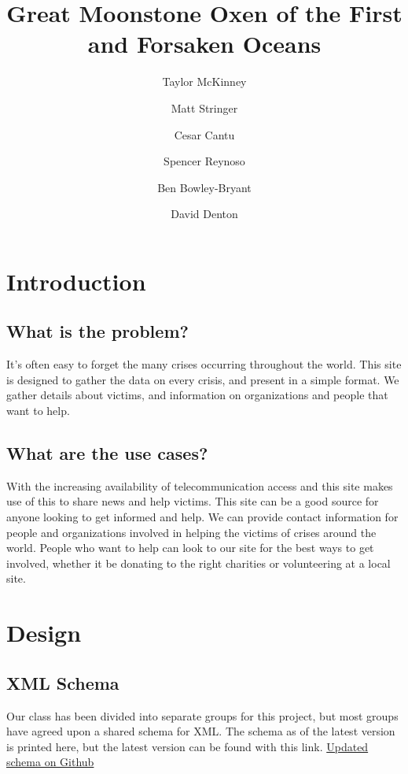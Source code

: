 \documentclass[12pt]{report}
\title{Great Moonstone Oxen of the First and Forsaken Oceans}
\author{
    Taylor McKinney
    \and Matt Stringer
    \and Cesar Cantu
    \and Spencer Reynoso
    \and Ben Bowley-Bryant
    \and David Denton}
\begin{document}
\maketitle

\section*{Introduction}
\subsection*{What is the problem?}
It's often easy to forget the many crises occurring throughout the world.
This site is designed to gather the data on every crisis, and present in a simple format.
We gather details about victims, and information on organizations and people that want to help.

\subsection*{What are the use cases?}
With the increasing availability of telecommunication access and this site makes use of this to share news and help victims.
This site can be a good source for anyone looking to get informed and help. 
We can provide contact information for people and organizations involved in helping the victims of crises around the world.
People who want to help can look to our site for the best ways to get involved, whether it be donating to the right charities or volunteering at a local site.

\newpage
\section*{Design}
\subsection*{XML Schema}
Our class has been divided into separate groups for this project, but most groups have agreed upon a shared schema for XML.
The schema as of the latest version is printed here, but the latest version can be found with this link.
\newline
\href{https://github.com/aaronj1335/cs373-wcdb1-schema/blob/master/WorldCrises.xsd.xml}{Updated schema on Github}
\newline
\end{document}

